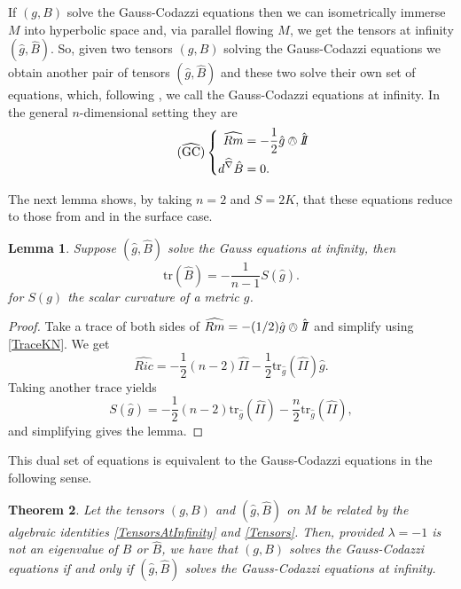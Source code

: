 \documentclass{amsart}
\newcommand{\two}{I\!\!I}
\newcommand{\tr}{\mathrm{tr}}
\newtheorem{thm}{Theorem}[section]
\newtheorem{lem}[thm]{Lemma}
\numberwithin{equation}{section}
\begin{document}
If $(g,B)$ solve the Gauss-Codazzi equations then we can isometrically immerse $M$ into hyperbolic space and, via parallel flowing $M$, we get the tensors at infinity $(\hat{g},\hat{B})$.
So, given two tensors $(g,B)$ solving the Gauss-Codazzi equations we obtain another pair of tensors $(\hat{g},\hat{B})$ and these two solve their own set of equations, which, following \cite{Krasnov-Schlenker2007}, we call the Gauss-Codazzi equations at infinity.
In the general $n$-dimensional setting they are 
\begin{equation}
\label{GCInf} \tag{$\widehat{\text{GC}}$}
\left\{
\begin{aligned}
\widehat{Rm} &= -\frac{1}{2} \hat{g} \owedge \hat{\two} \\
d^{\widehat{\nabla}} \hat{B} &= 0.
\end{aligned}
\right.
\end{equation}

The next lemma shows, by taking $n=2$ and $S = 2K$, that these equations reduce to those from \cite{Krasnov-Schlenker2008} and \cite{Bridgeman-Bromberg2022} in the surface case.

\begin{lem}
\label{TraceScalarCurv}
Suppose $(\hat{g},\hat{B})$ solve the Gauss equations at infinity, then 
\[
\tr(\hat{B}) = -\frac{1}{n-1}S(\hat{g}).
\]
for $S(g)$ the scalar curvature of a metric $g$.
\end{lem}

\begin{proof}
Take a trace of both sides of $\widehat{Rm} = -(1/2)\hat{g}\owedge\hat{\two}$ and simplify using \eqref{TraceKN}.
We get
\[
\widehat{Ric} = -\frac{1}{2}(n-2)\hat{\two} -\frac{1}{2}\tr_{\hat{g}}(\hat{\two})\hat{g}.
\]
Taking another trace yields
\[
S(\hat{g}) = -\frac{1}{2}(n-2)\tr_{\hat{g}}(\hat{\two}) - \frac{n}{2}\tr_{\hat{g}}(\hat{\two}),
\]
and simplifying gives the lemma.
\end{proof}


This dual set of equations is equivalent to the Gauss-Codazzi equations in the following sense.


\begin{thm}
\label{DualEquations}
Let the tensors $(g,B)$ and $(\hat{g},\hat{B})$ on $M$ be related by the algebraic identities \eqref{TensorsAtInfinity} and \eqref{Tensors}. 
Then, provided $\lambda =-1$ is not an eigenvalue of $B$ or $\hat{B}$, we have that $(g,B)$ solves the Gauss-Codazzi equations if and only if $(\hat{g},\hat{B})$ solves the Gauss-Codazzi equations at infinity.
\end{thm}
\end{document}
